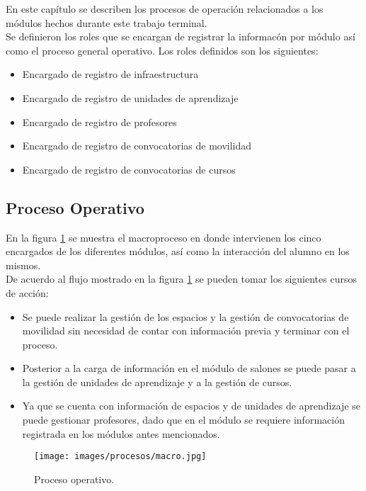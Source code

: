 En este capítulo se describen los procesos de operación relacionados a los módulos hechos durante este trabajo terminal. \\

Se definieron los roles que se encargan de registrar la informacón por módulo así como el proceso general operativo. Los roles definidos son los siguientes:

\begin{itemize}
	\item {Encargado de registro de infraestructura}
	\item {Encargado de registro de unidades de aprendizaje}
	\item {Encargado de registro de profesores}
	\item {Encargado de registro de convocatorias de movilidad}
	\item {Encargado de registro de convocatorias de cursos}
\end{itemize}

\subsection{Proceso Operativo}

En la figura \ref{fig:macro} se muestra el macroproceso en donde intervienen los cinco encargados de los diferentes módulos, así como la interacción del alumno en los mismos. \\
De acuerdo al flujo mostrado en la figura \ref{fig:macro} se pueden tomar los siguientes cursos de acción:  

\begin{itemize}
	\item {Se puede realizar la gestión de los espacios y la gestión de convocatorias de movilidad sin necesidad de contar con información previa y terminar con el proceso.}
	\item {Posterior a la carga de información en el módulo de salones se puede pasar a la gestión de unidades de aprendizaje y a la gestión de cursos.}
	\item {Ya que se cuenta con información de espacios y de unidades de aprendizaje se puede gestionar profesores, dado que en el módulo se requiere información registrada en los módulos antes mencionados.}
\end{itemize}

\begin{figure}[h!]
	\begin{center}
		\texttt{[image: images/procesos/macro.jpg]}
		\caption{Proceso operativo.}
		\label{fig:macro}
	\end{center}
\end{figure}


